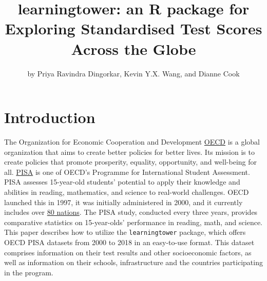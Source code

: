 \title{learningtower: an R package for Exploring Standardised Test
Scores Across the Globe}
\author{by Priya Ravindra Dingorkar, Kevin Y.X. Wang, and Dianne Cook}

\maketitle


\hypertarget{introduction}{%
\section{Introduction}\label{introduction}}

The Organization for Economic Cooperation and Development
\href{https://www.oecd.org/about/}{OECD} is a global organization that
aims to create better policies for better lives. Its mission is to
create policies that promote prosperity, equality, opportunity, and
well-being for all. \citep{oecd} \href{https://www.oecd.org/pisa/}{PISA}
is one of OECD's Programme for International Student Assessment. PISA
assesses 15-year-old students' potential to apply their knowledge and
abilities in reading, mathematics, and science to real-world challenges.
OECD launched this in 1997, it was initially administered in 2000, and
it currently includes over
\href{https://www.oecd.org/pisa/aboutpisa/pisa-participants.htm}{80
nations}. \citep{pisa} The PISA study, conducted every three years,
provides comparative statistics on 15-year-olds' performance in reading,
math, and science. This paper describes how to utilize the
\texttt{learningtower} package, which offers OECD PISA datasets from
2000 to 2018 in an easy-to-use format. This dataset comprises
information on their test results and other socioeconomic factors, as
well as information on their schools, infrastructure and the countries
participating in the program.

